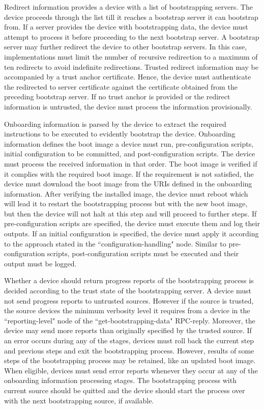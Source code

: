 \begin{enumerate}
	\par
	Redirect information provides a device with a list of bootstrapping servers. The device proceeds through the list till it reaches a bootstrap server it can bootstrap from. If a server provides the device with bootstrapping data, the device must attempt to process it before proceeding to the next bootstrap server. A bootstrap server may further redirect the device to other bootstrap servers. In this case, implementations must limit the number of recursive redirection to a maximum of ten redirects to avoid indefinite redirections. Trusted redirect information may be accompanied by a trust anchor certificate. Hence, the device must authenticate the redirected to server certificate against the certificate obtained from the preceding bootstrap server. If no trust anchor is provided or the redirect information is untrusted, the device must process the information provisionally.
	\par
	Onboarding information is parsed by the device to extract the required instructions to be executed to evidently bootstrap the device. Onboarding information defines the boot image a device must run, pre-configuration scripts, initial configuration to be committed, and post-configuration scripts. The device must process the received information in that order. The boot image is verified if it complies with the required boot image. If the requirement is not satisfied, the device must download the boot image from the URIs defined in the onboarding information. After verifying the installed image, the device must reboot which will lead it to restart the bootstrapping process but with the new boot image, but then the device will not halt at this step and will proceed to further steps. If pre-configuration scripts are specified, the device must execute them and log their outputs. If an initial configuration is specified, the device must apply it according to the approach stated in the ``configuration-handling" node. Similar to pre-configuration scripts, post-configuration scripts must be executed and their output must be logged.
	\par
	Whether a device should return progress reports of the bootstrapping process is decided according to the trust state of the bootstrapping server. A device must not send progress reports to untrusted sources. However if the source is trusted, the source devices the minimum verbosity level it requires from a device in the ``reporting-level" node of the ``get-bootstrapping-data" RPC-reply. Moreover, the device may send more reports than originally specified by the trusted source. If an error occurs during any of the stages, devices must roll back the current step and previous steps and exit the bootstrapping process. However, results of some steps of the bootstrapping process may be retained, like an updated boot image. When eligible, devices must send error reports whenever they occur at any of the onboarding information processing stages. The bootstrapping process with current source should be quitted and the device should start the process over with the next bootstrapping source, if available.
	
\end{enumerate}

